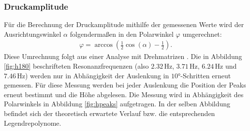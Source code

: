 \subsubsection{Druckamplitude}
Für die Berechnung der Druckamplitude mithilfe der gemessenen Werte wird der Ausrichtungswinkel $\alpha$ folgendermaßen in den Polarwinkel $\varphi$ umgerechnet:
\begin{align*}
  \varphi = \arccos(\frac{1}{2} \cos(\alpha) - \frac{1}{2}).
\end{align*}
Diese Umrechnung folgt aus einer Analyse mit Drehmatrizen \cite{qa-dresden}. Die in Abbildung \ref{fig:h180} beschrifteten Resonanzfrequenzen (also $2.32 \,\si{\hertz}$, $3.71 \,\si{\hertz}$, $6.24 \,\si{\hertz}$ und $7.46 \,\si{\hertz}$) werden nur in Abhängigkeit der Auslenkung in $10°$-Schritten erneut gemessen. Für diese Messung werden bei jeder Auslenkung die Position der Peaks erneut bestimmt und die Höhe abgelesen. 
Die Messung wird in Abhängigkeit des Polarwinkels in Abbildung \ref{fig:hpeaks} aufgetragen. In der selben Abbildung befindet sich der theoretisch erwartete Verlauf bzw. die entsprechenden Legendrepolynome. 
